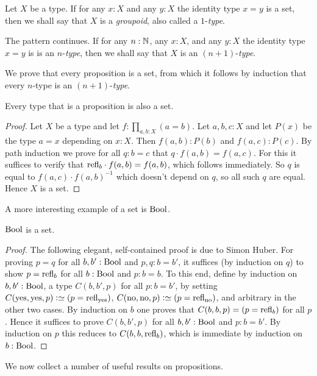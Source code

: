 Let $X$ be a type.
If for any $x:X$ and any $y:X$ the identity type $x=y$ is a set,
then we shall say that $X$ is a \emph{groupoid},
also called a $1$-\emph{type}.

The pattern continues.  If for any $n:\mathbb{N}$, any $x:X$, and any $y:X$ 
the identity type $x=y$ is is an $n$-\emph{type},
then we shall say that $X$ is an $(n+1)$-\emph{type}.

We prove that every proposition is a set, from which it follows
by induction that every $n$-type is an $(n+1)$-\emph{type}.

\begin{lemma}\label{lem:prop-is-set}
Every type that is a proposition is also a set.
\end{lemma}
\begin{proof}
Let $X$ be a type and let $f: \prod_{a,b:X} (a=b)$. Let $a,b,c : X$ and
let $P(x)$ be the type $a=x$ depending on $x:X$. Then
$f(a,b):P(b)$ and $f(a,c):P(c)$. By path induction we prove for
all $q:b=c$ that $q\cdot f(a,b) = f(a,c)$. For this it suffices to
verify that $\mathrm{refl}_{b} \cdot f(a,b) = f(a,b)$, which follows immediately.
So $q$ is equal to $f(a,c)\cdot f(a,b)^{-1}$ which doesn't
depend on $q$, so all such $q$ are equal. Hence $X$ is a set.
\end{proof}

A more interesting example of a set is $\mathrm{Bool}$.

\begin{lemma}\label{lem:isset-bool}
$\mathrm{Bool}$ is a set.
\end{lemma}
\begin{proof}
The following elegant, self-contained proof is due to Simon Huber.
For proving $p=q$ for all $b,b':\mathrm{Bool}$ and $p,q: b=b'$,
it suffices (by induction on $q$) to show
$p=\mathrm{refl}_{b}$ for all $b:\mathrm{Bool}$ and $p: b=b$.
To this end, define by induction on $b,b':\mathrm{Bool}$,
a type $C(b,b',p)$ for all $p: b=b'$, by setting
$C(\yes,\yes,p)\defeq (p=\refl{\yes})$,
$C(\no,\no,p)\defeq (p=\refl{\no})$,
and arbitrary in the other two cases.
By induction on $b$ one proves that $C(b,b,p)=(p=\mathrm{refl}_{b})$ for all $p$. 
Hence it suffices to prove $C(b,b',p)$ for all $b,b':\mathrm{Bool}$
and $p: b=b'$. By induction on $p$ this reduces to
$C(b,b,\mathrm{refl}_{b})$, which is immediate by induction on $b:\mathrm{Bool}$.
\end{proof}

We now collect a number of useful results on propositions.

